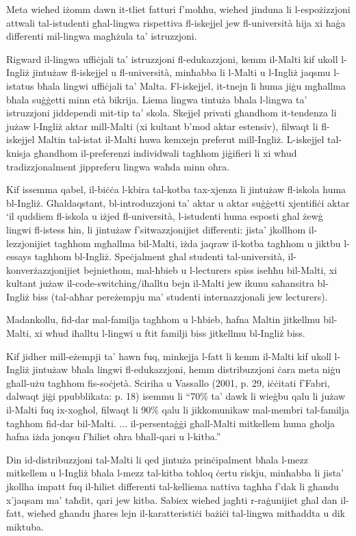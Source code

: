 \documentclass[]{../../metanetpaper}
\begin{document}
\begin{multicols}{2}
Meta wieħed iżomm dawn it-tliet fatturi f’moħħu, wieħed jinduna  li l-espożizzjoni attwali tal-istudenti għal-lingwa rispettiva fl-iskejjel jew fl-università hija xi ħaġa differenti mil-lingwa magħżula ta’ istruzzjoni.

Rigward il-lingwa uffiċjali ta’ istruzzjoni fl-edukazzjoni, kemm il-Malti kif ukoll l-Ingliż jintużaw fl-iskejjel u fl-università, minħabba li l-Malti u l-Ingliż jaqsmu l-istatus bħala lingwi uffiċjali ta’ Malta. Fl-iskejjel, it-tnejn li huma jiġu mgħallma bħala suġġetti minn età bikrija. Liema lingwa tintuża bħala l-lingwa ta’ istruzzjoni jiddependi mit-tip ta’ skola. Skejjel privati għandhom it-tendenza li jużaw l-Ingliż aktar mill-Malti (xi kultant b’mod aktar estensiv), filwaqt li fl-iskejjel Maltin tal-istat il-Malti huwa kemxejn preferut mill-Ingliż. L-iskejjel tal-knisja għandhom il-preferenzi individwali tagħhom jiġifieri li xi wħud tradizzjonalment jippreferu lingwa waħda minn oħra.

Kif issemma qabel, il-biċċa l-kbira tal-kotba tax-xjenza li jintużaw fl-iskola huma bl-Ingliż. Għaldaqstant, bl-introduzzjoni ta’ aktar u aktar suġġetti xjentifiċi aktar ‘il quddiem fl-iskola u iżjed fl-università, l-istudenti huma esposti għal żewġ lingwi fl-istess ħin, li jintużaw f'sitwazzjonijiet differenti: jista’ jkollhom il-lezzjonijiet tagħhom mgħallma bil-Malti, iżda jaqraw il-kotba tagħhom u jiktbu l-essays tagħhom bl-Ingliż. Speċjalment għal studenti tal-università, il-konverżazzjonijiet bejniethom, mal-ħbieb u l-lecturers spiss iseħħu bil-Malti, xi kultant jużaw il-code-switching/iħalltu bejn il-Malti jew ikunu saħansitra bl-Ingliż biss (tal-aħħar pereżempju ma’ studenti internazzjonali jew lecturers).

Madankollu, fid-dar mal-familja tagħhom u l-ħbieb, ħafna Maltin jitkellmu bil-Malti, xi wħud iħalltu l-lingwi u ftit familji biss jitkellmu bl-Ingliż biss.

Kif jidher mill-eżempji ta’ hawn fuq, minkejja l-fatt li kemm il-Malti kif ukoll l-Ingliż jintużaw bħala lingwi fl-edukazzjoni, hemm distribuzzjoni ċara meta niġu għall-użu tagħhom fis-soċjetà. Sciriha u Vassallo (2001, p. 29, iċċitati f’Fabri, dalwaqt jiġi ppubblikata: p. 18) isemmu li ``70\% ta’ dawk li wieġbu qalu li jużaw il-Malti fuq ix-xogħol, filwaqt li 90\% qalu li jikkomunikaw mal-membri tal-familja tagħhom fid-dar bil-Malti. ... il-persentaġġi għall-Malti mitkellem huma għolja ħafna iżda jonqsu f’ħiliet oħra bħall-qari u l-kitba.'' 

Din id-distribuzzjoni tal-Malti li qed jintuża prinċipalment bħala l-mezz mitkellem u l-Ingliż bħala l-mezz tal-kitba toħloq ċertu riskju, minħabba li jista’ jkollha impatt fuq il-ħiliet differenti tal-kelliema nattiva tagħha f’dak li għandu x’jaqsam ma’ taħdit, qari jew kitba. Sabiex wieħed jagħti r-raġunijiet għal dan il-fatt, wieħed għandu jħares lejn il-karatteristiċi bażiċi tal-lingwa mitħaddta u dik miktuba.


\end{multicols}
\end{document}
